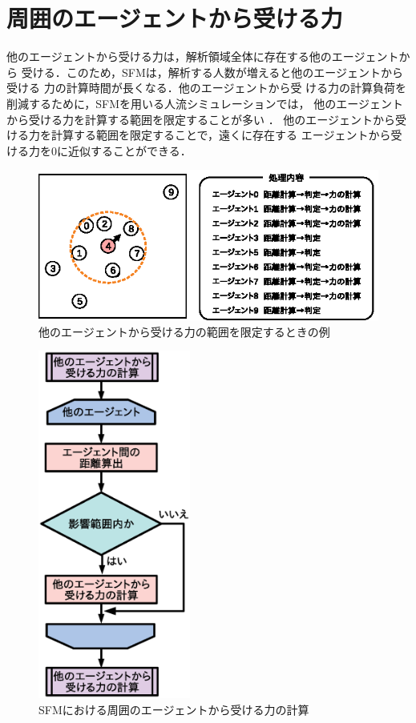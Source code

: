\section{周囲のエージェントから受ける力}
他のエージェントから受ける力は，解析領域全体に存在する他のエージェントから
受ける．このため，SFMは，解析する人数が増えると他のエージェントから受ける
力の計算時間が長くなる．他のエージェントから受
ける力の計算負荷を削減するために，SFMを用いる人流シミュレーションでは，
他のエージェントから受ける力を計算する範囲を限定することが多い
\cite{seru_sfm1}\cite{seru_sfm2}．
他のエージェントから受ける力を計算する範囲を限定することで，遠くに存在する
エージェントから受ける力を0に近似することができる．
%
\begin{figure}[t]
 \begin{center}
  \includegraphics[width=11.5cm,clip]{figure/eikyo_hankei_ex1.eps}
  \caption{他のエージェントから受ける力の範囲を限定するときの例}
  \label{fig:sougo_hani}
 \end{center}
\end{figure}
%
\begin{figure}[t]
 \begin{center}
  \includegraphics[width=5cm,clip]{figure/agent_flow.eps}
  \caption{SFMにおける周囲のエージェントから受ける力の計算}
  \label{fig:sougo_hani_flow}
 \end{center}
\end{figure}
